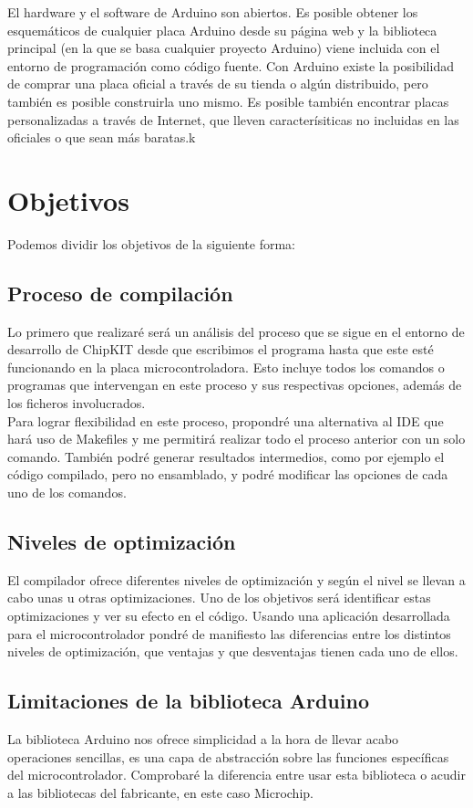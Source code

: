 El hardware y el software de Arduino son abiertos. Es posible obtener los esquemáticos de cualquier placa Arduino desde su página web y la biblioteca principal (en la que se basa cualquier proyecto Arduino) viene incluida con el entorno de programación como código fuente. Con Arduino existe la posibilidad de comprar una placa oficial a través de su tienda o algún distribuido, pero también es posible construirla uno mismo. Es posible también encontrar placas personalizadas a través de Internet, que lleven caracterísiticas no incluidas en las oficiales o que sean más baratas.k
\section{Objetivos}
Podemos dividir los objetivos de la siguiente forma:

\subsection{Proceso de compilación}
Lo primero que realizaré será un análisis del proceso que se sigue en el entorno de desarrollo de ChipKIT desde que escribimos el programa hasta que este esté funcionando en la placa microcontroladora.  Esto incluye todos los comandos o programas que intervengan en este proceso y sus respectivas opciones, además de los ficheros involucrados.\\
Para lograr flexibilidad en este proceso, propondré una alternativa al IDE que hará uso de Makefiles y me permitirá realizar todo el proceso anterior con un solo comando. También podré generar resultados intermedios, como por ejemplo el código compilado, pero no ensamblado, y podré modificar las opciones de cada uno de los comandos.

\subsection{Niveles de optimización}
El compilador ofrece diferentes niveles de optimización y según el nivel se llevan a cabo unas u otras optimizaciones. Uno de los objetivos será identificar estas optimizaciones y ver su efecto en el código. Usando una aplicación desarrollada para el microcontrolador pondré de manifiesto las diferencias entre los distintos niveles de optimización, que ventajas y que desventajas tienen cada uno de ellos.

\subsection{Limitaciones de la biblioteca Arduino}
La biblioteca Arduino nos ofrece simplicidad a la hora de llevar acabo operaciones sencillas, es una capa de abstracción sobre las funciones específicas del microcontrolador. Comprobaré la diferencia entre usar esta biblioteca o acudir a las bibliotecas del fabricante, en este caso Microchip.

